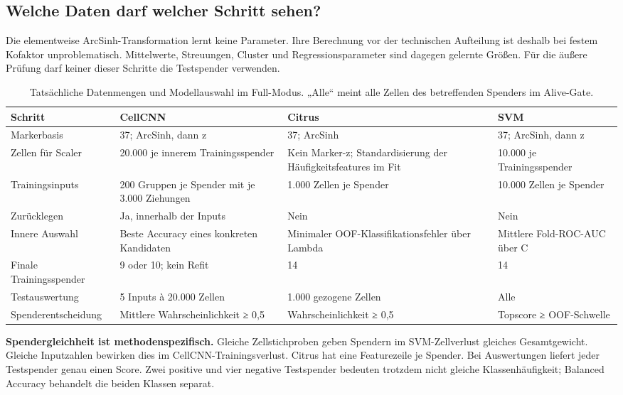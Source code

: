 \documentclass[11pt,a4paper]{article}
\begin{document}
\clearpage
\subsection*{Welche Daten darf welcher Schritt sehen?}
Die elementweise ArcSinh-Transformation lernt keine Parameter. Ihre
Berechnung vor der technischen Aufteilung ist deshalb bei festem Kofaktor
unproblematisch. Mittelwerte, Streuungen, Cluster und Regressionsparameter
sind dagegen gelernte Größen. Für die äußere Prüfung darf keiner dieser
Schritte die Testspender verwenden.

\begin{table}[!ht]\centering\small
\caption{Tatsächliche Datenmengen und Modellauswahl im Full-Modus.
„Alle“ meint alle Zellen des betreffenden Spenders im Alive-Gate.}
\begin{tabular}{p{4cm}p{3.6cm}p{3.6cm}p{3.6cm}}\toprule
Schritt & CellCNN & Citrus & SVM\\\midrule
Markerbasis & 37; ArcSinh, dann z & 37; ArcSinh & 37; ArcSinh, dann z\\
Zellen für Scaler & 20.000 je innerem Trainingsspender & Kein Marker-z; Standardisierung der Häufigkeitsfeatures im Fit & 10.000 je Trainingsspender\\
Trainingsinputs & 200 Gruppen je Spender mit je 3.000 Ziehungen & 1.000 Zellen je Spender & 10.000 Zellen je Spender\\
Zurücklegen & Ja, innerhalb der Inputs & Nein & Nein\\
Innere Auswahl & Beste Accuracy eines konkreten Kandidaten & Minimaler OOF-Klassifikationsfehler über Lambda & Mittlere Fold-ROC-AUC über C\\
Finale Trainingsspender & 9 oder 10; kein Refit & 14 & 14\\
Testauswertung & 5 Inputs à 20.000 Zellen & 1.000 gezogene Zellen & Alle\\
Spenderentscheidung & Mittlere Wahrscheinlichkeit ≥ 0,5 & Wahrscheinlichkeit ≥ 0,5 & Topscore ≥ OOF-Schwelle\\
\bottomrule\end{tabular}
\end{table}

\textbf{Spendergleichheit ist methodenspezifisch.} Gleiche Zellstichproben
geben Spendern im SVM-Zellverlust gleiches Gesamtgewicht. Gleiche Inputzahlen
bewirken dies im CellCNN-Trainingsverlust. Citrus hat eine Featurezeile je
Spender. Bei Auswertungen liefert jeder Testspender genau einen Score.
Zwei positive und vier negative Testspender bedeuten trotzdem nicht gleiche
Klassenhäufigkeit; Balanced Accuracy behandelt die beiden Klassen separat.
\end{document}
